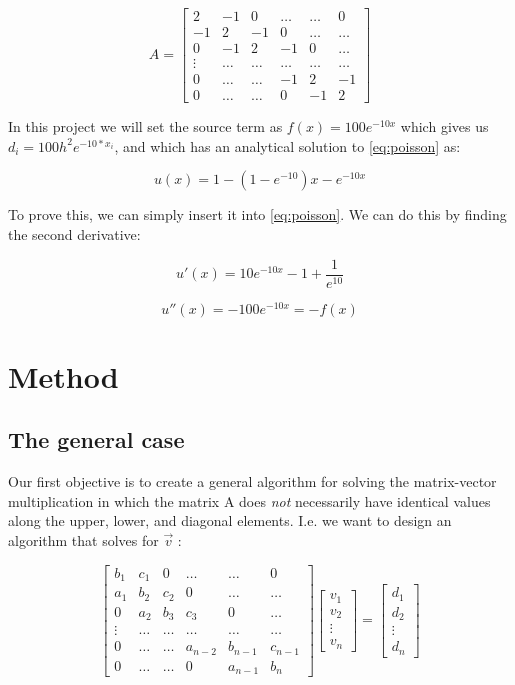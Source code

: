 \documentclass[a4paper,10pt,English]{article}
\begin{document}
$$A = \begin{bmatrix}
2 & -1 & 0 & \dots & \dots & 0 \\
-1 & 2 & -1 & 0 & \dots & \dots \\
0 & -1 & 2 & -1 & 0 & \dots \\
\vdots & \dots & \dots & \dots & \dots & \dots \\
0 & \dots & \dots & -1 & 2 & -1 \\
0 & \dots & \dots & 0 & -1 & 2 
\end{bmatrix}
$$

In this project we will set the source term as $f(x) = 100e^{-10x}$ which gives us $d_i = 100h^2 e^{-10*x_i}$, and which has an analytical solution to \ref{eq:poisson} as:

\begin{equation}\label{eq:exact}
    u(x) = 1 - (1 - e^{-10})x - e^{-10x}
\end{equation}

To prove this, we can simply insert it into \ref{eq:poisson}. We can do this by finding the second derivative:

$$u'(x) = 10 e^{-10x} - 1 + \frac{1}{e^10}$$

$$u''(x) = -100e^{-10x} = -f(x)$$

\section{Method}

\subsection{The general case} \label{sec:general}
Our first objective is to create a general algorithm for solving the matrix-vector multiplication in which the matrix A does \textit{not} necessarily have identical values along the upper, lower, and diagonal elements. I.e. we want to design an algorithm that solves for $\vec{v}$ :

\begin{equation}
    \begin{bmatrix}
b_1 & c_1 & 0 & \dots & \dots & 0 \\
a_1 & b_2 & c_2 & 0 & \dots & \dots \\
0 & a_2 & b_3 & c_3 & 0 & \dots \\
\vdots & \dots & \dots & \dots & \dots & \dots \\
0 & \dots & \dots & a_{n-2} & b_{n-1} & c_{n-1} \\
0 & \dots & \dots & 0 & a_{n-1} & b_n 
\end{bmatrix} \begin{bmatrix} v_1 \\ v_2 \\ \vdots \\ v_n \end{bmatrix} = \begin{bmatrix} d_1 \\ d_2 \\ \vdots \\ d_n \end{bmatrix}
\end{equation}
\end{document}
